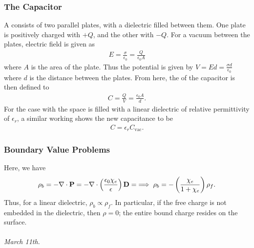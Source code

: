 \subsubsection{The Capacitor}
A  consists of two parallel plates, with a dielectric filled between them. One plate is positively charged with $+Q$, and the other with $-Q$. For a vacuum between the plates, electric field is given as
\begin{align}
    E = \frac{\sigma}{\epsilon_{0}} = \frac{Q}{\epsilon_{0} A}
\end{align}
where $A$ is the area of the plate. Thus the potential is given by $V = Ed = \frac{\sigma d}{\epsilon_{0}}$ where $d$ is the distance between the plates. From here, the  of the capacitor is then defined to \begin{align}
    C = \frac{Q}{V} = \frac{\epsilon_{0} A}{d}.
\end{align}
For the case with the space is filled with a linear dielectric of relative permittivity of $\epsilon_{r}$, a similar working shows the new capacitance to be \begin{align}
    C = \epsilon_{r} C_{\text{vac}}.
\end{align}

\subsubsection{Boundary Value Problems}
Here, we have
\begin{align}
    \rho_{b} = - \nabla \cdot \mathbf{P} = - \nabla \cdot \left( \frac{\epsilon_{0} \chi_{e}}{\epsilon} \right) \mathbf{D} = \implies \rho_{b} = - \left( \frac{\chi_{e}}{1 + \chi_{e}} \right) \rho_{f}.
\end{align}
Thus, for a linear dielectric, $\rho_{b} \propto \rho_{f}$. In particular, if the free charge is not embedded in the dielectric, then $\rho = 0$; the entire bound charge resides on the surface.
\\ \\
\textit{March 11th.}

